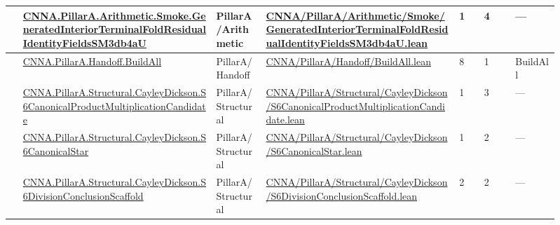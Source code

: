 \begin{longtable}{L{0.025\linewidth} L{0.315\linewidth} L{0.08\linewidth} L{0.315\linewidth} L{0.045\linewidth} L{0.055\linewidth} L{0.07\linewidth}}
\hline
{} & \href{run:repo_snapshot/CNNA/PillarA/Arithmetic/Smoke/GeneratedInteriorTerminalFoldResidualIdentityFieldsSM3db4aU.lean}{CNNA.\allowbreak{}PillarA.\allowbreak{}Arithmetic.\allowbreak{}Smoke.\allowbreak{}GeneratedInteriorTerminalFoldResidualIdentityFieldsSM3db4aU} & PillarA/\allowbreak{}Arithmetic & \href{run:repo_snapshot/CNNA/PillarA/Arithmetic/Smoke/GeneratedInteriorTerminalFoldResidualIdentityFieldsSM3db4aU.lean}{CNNA/\allowbreak{}PillarA/\allowbreak{}Arithmetic/\allowbreak{}Smoke/\allowbreak{}GeneratedInteriorTerminalFoldResidualIdentityFieldsSM3db4aU.\allowbreak{}lean} & 1 & 4 & ---\\
\hline
{} & \href{run:repo_snapshot/CNNA/PillarA/Handoff/BuildAll.lean}{CNNA.\allowbreak{}PillarA.\allowbreak{}Handoff.\allowbreak{}BuildAll} & PillarA/\allowbreak{}Handoff & \href{run:repo_snapshot/CNNA/PillarA/Handoff/BuildAll.lean}{CNNA/\allowbreak{}PillarA/\allowbreak{}Handoff/\allowbreak{}BuildAll.\allowbreak{}lean} & 8 & 1 & BuildAll\\
\hline
{} & \href{run:repo_snapshot/CNNA/PillarA/Structural/CayleyDickson/S6CanonicalProductMultiplicationCandidate.lean}{CNNA.\allowbreak{}PillarA.\allowbreak{}Structural.\allowbreak{}CayleyDickson.\allowbreak{}S6CanonicalProductMultiplicationCandidate} & PillarA/\allowbreak{}Structural & \href{run:repo_snapshot/CNNA/PillarA/Structural/CayleyDickson/S6CanonicalProductMultiplicationCandidate.lean}{CNNA/\allowbreak{}PillarA/\allowbreak{}Structural/\allowbreak{}CayleyDickson/\allowbreak{}S6CanonicalProductMultiplicationCandidate.\allowbreak{}lean} & 1 & 3 & ---\\
\hline
{} & \href{run:repo_snapshot/CNNA/PillarA/Structural/CayleyDickson/S6CanonicalStar.lean}{CNNA.\allowbreak{}PillarA.\allowbreak{}Structural.\allowbreak{}CayleyDickson.\allowbreak{}S6CanonicalStar} & PillarA/\allowbreak{}Structural & \href{run:repo_snapshot/CNNA/PillarA/Structural/CayleyDickson/S6CanonicalStar.lean}{CNNA/\allowbreak{}PillarA/\allowbreak{}Structural/\allowbreak{}CayleyDickson/\allowbreak{}S6CanonicalStar.\allowbreak{}lean} & 1 & 2 & ---\\
\hline
{} & \href{run:repo_snapshot/CNNA/PillarA/Structural/CayleyDickson/S6DivisionConclusionScaffold.lean}{CNNA.\allowbreak{}PillarA.\allowbreak{}Structural.\allowbreak{}CayleyDickson.\allowbreak{}S6DivisionConclusionScaffold} & PillarA/\allowbreak{}Structural & \href{run:repo_snapshot/CNNA/PillarA/Structural/CayleyDickson/S6DivisionConclusionScaffold.lean}{CNNA/\allowbreak{}PillarA/\allowbreak{}Structural/\allowbreak{}CayleyDickson/\allowbreak{}S6DivisionConclusionScaffold.\allowbreak{}lean} & 2 & 2 & ---\\

\end{longtable}
